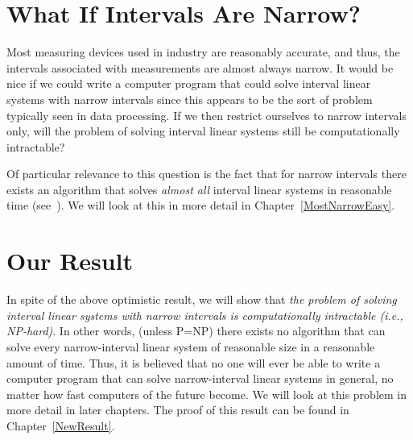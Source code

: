 \section{What If Intervals Are Narrow?}

Most measuring devices used in industry are reasonably accurate, and thus,
the intervals associated with measurements are almost always narrow.  It would
be nice if we could write a computer program that could solve interval linear
systems with narrow intervals since this appears to be the sort of problem
typically seen in data processing.
If we then restrict ourselves to narrow intervals only, will the problem
of solving interval linear systems still be computationally intractable?

Of particular relevance to this question is the fact that for narrow
intervals there exists an algorithm that solves {\em almost all\/} interval
linear systems in reasonable time (see~\cite{Kreinovich1996a,Lakeyev1995}).  
We will look at this in more detail in Chapter~\ref{MostNarrowEasy}.

\section{Our Result}

In spite of the above optimistic result, we will show that {\em the problem
of solving interval linear systems with narrow intervals is computationally
intractable (i.e., \/{\rm NP}-hard)}.  In other words, (unless P=NP) there
exists no algorithm that can solve every narrow-interval linear system of
reasonable size in a reasonable amount of time.  Thus, it is believed that no
one will ever be able to write a computer program that can solve
narrow-interval linear systems in general, no matter how fast computers of
the future become.  We will look at this problem in more detail in later
chapters.  The proof of this result can be found in Chapter~\ref{NewResult}.
